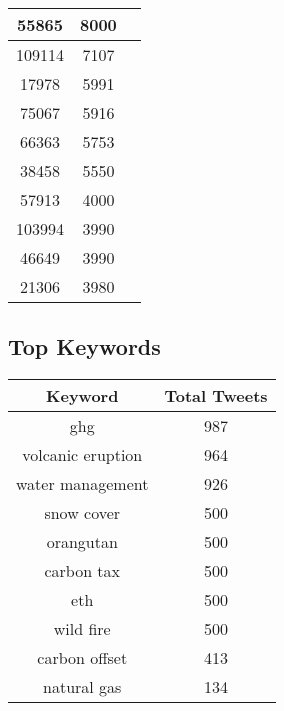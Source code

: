 \documentclass{article}\usepackage[T1]{fontenc}
\begin{document}
\begin{tabular}{|c|c|c|}
 \hline
55865 & 8000\\ 
 \hline
109114 & 7107\\ 
 \hline
17978 & 5991\\ 
 \hline
75067 & 5916\\ 
 \hline
66363 & 5753\\ 
 \hline
38458 & 5550\\ 
 \hline
57913 & 4000\\ 
 \hline
103994 & 3990\\ 
 \hline
46649 & 3990\\ 
 \hline
21306 & 3980\\ 
 \hline
\end{tabular}\subsection*{Top Keywords}\begin{tabular}{|c|c|}         \hline         Keyword & Total Tweets \\ 
 \hline
ghg & 987\\ 
 \hline
volcanic eruption & 964\\ 
 \hline
water management & 926\\ 
 \hline
snow cover & 500\\ 
 \hline
orangutan & 500\\ 
 \hline
carbon tax & 500\\ 
 \hline
eth & 500\\ 
 \hline
wild fire & 500\\ 
 \hline
carbon offset & 413\\ 
 \hline
natural gas & 134\\ 
 \hline
\end{tabular}
\end{document}
